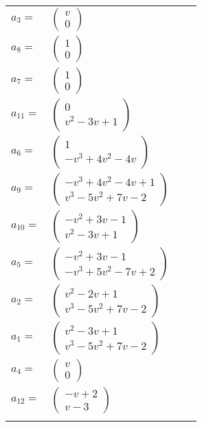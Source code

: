 \documentclass[1p]{elsarticle_modified}
\theoremstyle{definition}
\begin{document}
\begin{tabular}{m{7pt} m{180pt} m{7pt} m{180pt} }
\flushright $a_{3}=$&$\begin{pmatrix}v\\0\end{pmatrix}$ \\
\flushright $a_{8}=$&$\begin{pmatrix}1\\0\end{pmatrix}$ \\
\flushright $a_{7}=$&$\begin{pmatrix}1\\0\end{pmatrix}$ \\
\flushright $a_{11}=$&$\begin{pmatrix}0\\v^2-3 v+1\end{pmatrix}$ \\
\flushright $a_{6}=$&$\begin{pmatrix}1\\- v^3+4 v^2-4 v\end{pmatrix}$ \\
\flushright $a_{9}=$&$\begin{pmatrix}- v^3+4 v^2-4 v+1\\v^3-5 v^2+7 v-2\end{pmatrix}$ \\
\flushright $a_{10}=$&$\begin{pmatrix}- v^2+3 v-1\\v^2-3 v+1\end{pmatrix}$ \\
\flushright $a_{5}=$&$\begin{pmatrix}- v^2+3 v-1\\- v^3+5 v^2-7 v+2\end{pmatrix}$ \\
\flushright $a_{2}=$&$\begin{pmatrix}v^2-2 v+1\\v^3-5 v^2+7 v-2\end{pmatrix}$ \\
\flushright $a_{1}=$&$\begin{pmatrix}v^2-3 v+1\\v^3-5 v^2+7 v-2\end{pmatrix}$ \\
\flushright $a_{4}=$&$\begin{pmatrix}v\\0\end{pmatrix}$ \\
\flushright $a_{12}=$&$\begin{pmatrix}- v+2\\v-3\end{pmatrix}$\\&\end{tabular}
\end{document}
